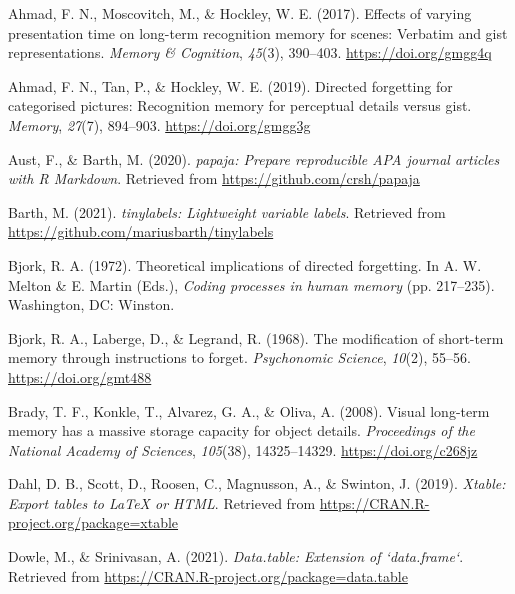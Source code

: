 \documentclass[
  man,floatsintext]{apa6}
\newlength{\cslhangindent}
\newlength{\cslentryspacingunit} %
\newenvironment{CSLReferences}[2] %
 {%
  \setlength{\parindent}{0pt}
  \ifodd #1
  \let\oldpar\par
  \def\par{\hangindent=\cslhangindent\oldpar}
  \fi
  \setlength{\parskip}{#2\cslentryspacingunit}
 }%
 {}
\begin{document}
\hypertarget{refs}{}
\begin{CSLReferences}{1}{0}
\leavevmode{}%
Ahmad, F. N., Moscovitch, M., \& Hockley, W. E. (2017). Effects of varying presentation time on long-term recognition memory for scenes: {Verbatim} and gist representations. \emph{Memory \& Cognition}, \emph{45}(3), 390--403. \url{https://doi.org/gmgg4q}

\leavevmode{}%
Ahmad, F. N., Tan, P., \& Hockley, W. E. (2019). Directed forgetting for categorised pictures: Recognition memory for perceptual details versus gist. \emph{Memory}, \emph{27}(7), 894--903. \url{https://doi.org/gmgg3g}

\leavevmode{}%
Aust, F., \& Barth, M. (2020). \emph{{papaja}: {Prepare} reproducible {APA} journal articles with {R Markdown}}. Retrieved from \url{https://github.com/crsh/papaja}

\leavevmode{}%
Barth, M. (2021). \emph{{tinylabels}: Lightweight variable labels}. Retrieved from \url{https://github.com/mariusbarth/tinylabels}

\leavevmode{}%
Bjork, R. A. (1972). Theoretical implications of directed forgetting. In A. W. Melton \& E. Martin (Eds.), \emph{Coding processes in human memory} (pp. 217--235). {Washington, DC}: {Winston}.

\leavevmode{}%
Bjork, R. A., Laberge, D., \& Legrand, R. (1968). The modification of short-term memory through instructions to forget. \emph{Psychonomic Science}, \emph{10}(2), 55--56. \url{https://doi.org/gmt488}

\leavevmode{}%
Brady, T. F., Konkle, T., Alvarez, G. A., \& Oliva, A. (2008). Visual long-term memory has a massive storage capacity for object details. \emph{Proceedings of the National Academy of Sciences}, \emph{105}(38), 14325--14329. \url{https://doi.org/c268jz}

\leavevmode{}%
Dahl, D. B., Scott, D., Roosen, C., Magnusson, A., \& Swinton, J. (2019). \emph{Xtable: Export tables to LaTeX or HTML}. Retrieved from \url{https://CRAN.R-project.org/package=xtable}

\leavevmode{}%
Dowle, M., \& Srinivasan, A. (2021). \emph{Data.table: Extension of `data.frame`}. Retrieved from \url{https://CRAN.R-project.org/package=data.table}


\end{CSLReferences}
\end{document}
